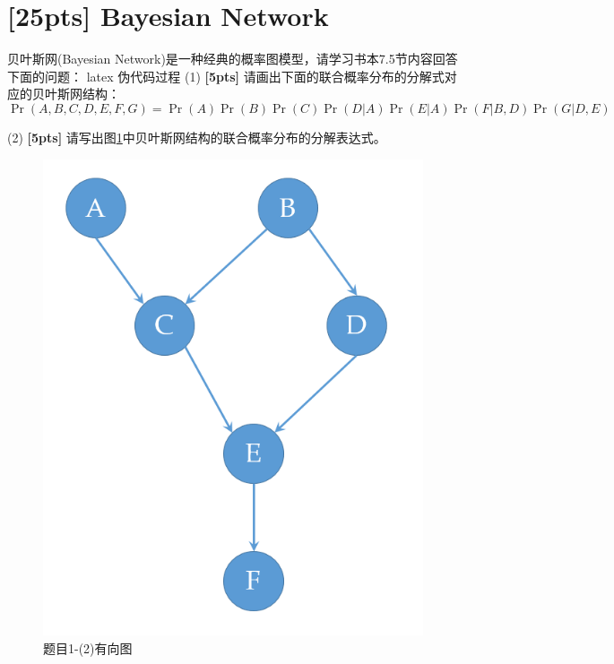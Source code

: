 \documentclass[a4paper,UTF8]{article}
\theoremstyle{definition}
\begin{document}
	\newpage




\section{\textbf{[25pts]} Bayesian Network}
贝叶斯网(Bayesian Network)是一种经典的概率图模型，请学习书本7.5节内容回答下面的问题：
latex 伪代码过程
(1) \textbf{[5pts]} 请画出下面的联合概率分布的分解式对应的贝叶斯网结构：
\begin{equation*}
\Pr(A, B, C, D, E, F, G) = \Pr(A)\Pr(B)\Pr(C)\Pr(D|A)\Pr(E|A)\Pr(F|B, D)\Pr(G|D, E)
\end{equation*}

(2) \textbf{[5pts]} 请写出图\ref{fig-DAG}中贝叶斯网结构的联合概率分布的分解表达式。
\begin{figure}[h]
\centering
\includegraphics[scale=0.3]{bayes_net.png}
\caption{题目1-(2)有向图}
\label{fig-DAG}
\end{figure}
\end{document}
